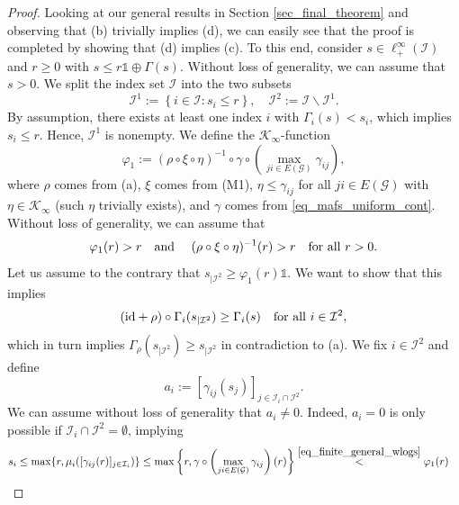 \documentclass[10pt,a4paper]{amsart}
\newcommand{\GC}{\mathcal{G}}
\newcommand{\IC}{\mathcal{I}}
\newcommand{\KC}{\mathcal{K}}
\newcommand{\id}{\mathrm{id}}
\newcommand{\unit}{\mathds{1}}
\begin{document}
\begin{proof}
Looking at our general results in Section \ref{sec_final_theorem} and observing that (b) trivially implies (d), we can easily see that the proof is completed by showing that (d) implies (c). To this end, consider $s \in \ell^{\infty}_+(\IC)$ and $r \geq 0$ with $s \leq r\unit \oplus \Gamma(s)$. Without loss of generality, we can assume that $s > 0$. We split the index set $\IC$ into the two subsets%
\begin{equation*}
  \IC^1 := \left\{ i \in \IC : s_i \leq r \right\},\quad \IC^2 := \IC \backslash \IC^1.%
\end{equation*}
By assumption, there exists at least one index $i$ with $\Gamma_i(s) < s_i$, which implies $s_i \leq r$. Hence, $\IC^1$ is nonempty. We define the $\KC_{\infty}$-function%
\begin{equation*}
  \varphi_1 := (\rho \circ \xi \circ \eta)^{-1} \circ \gamma \circ \left(\max_{ji \in E(\GC)}\gamma_{ij}\right),%
\end{equation*}
where $\rho$ comes from (a), $\xi$ comes from (M1), $\eta \leq \gamma_{ij}$ for all $ji \in E(\GC)$ with $\eta \in \KC_{\infty}$ (such $\eta$ trivially exists), and $\gamma$ comes from \eqref{eq_mafs_uniform_cont}. Without loss of generality, we can assume that%
\begin{equation}\label{eq_finite_general_wlogs}
  \varphi_1(r) > r \mbox{\quad and \quad} (\rho \circ \xi \circ \eta)^{-1}(r) > r \mbox{\quad for all\ } r > 0.%
\end{equation}
Let us assume to the contrary that $s_{|\IC^2} \geq \varphi_1(r)\unit$. We want to show that this implies%
\begin{equation*}
  (\id + \rho) \circ \Gamma_i(s_{|\IC^2}) \geq \Gamma_i(s) \mbox{\quad for all\ } i \in \IC^2,%
\end{equation*}
which in turn implies $\Gamma_{\rho}(s_{|\IC^2}) \geq s_{|\IC^2}$ in contradiction to (a). We fix $i \in \IC^2$ and define%
\begin{equation*}
  a_i := [\gamma_{ij}(s_j)]_{j \in \IC_i \cap \IC^2}.%
\end{equation*}
We can assume without loss of generality that $a_i \neq 0$. Indeed, $a_i = 0$ is only possible if $\IC_i \cap \IC^2 = \emptyset$, implying%
\begin{align*}
  s_i &\leq \max\{r,\mu_i([\gamma_{ij}(r)]_{j \in \IC_i})\} \leq \max\left\{r, \gamma \circ  \left(\max_{ji \in E(\GC)}\gamma_{ij}\right)(r) \right\} \stackrel{\eqref{eq_finite_general_wlogs}}{<} \varphi_1(r)%
\end{align*}

\end{proof}
\end{document}
